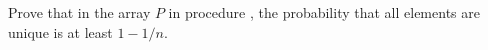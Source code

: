 Prove that in the array $P$ in procedure , the probability that all elements are unique is at least $1-1/n$.